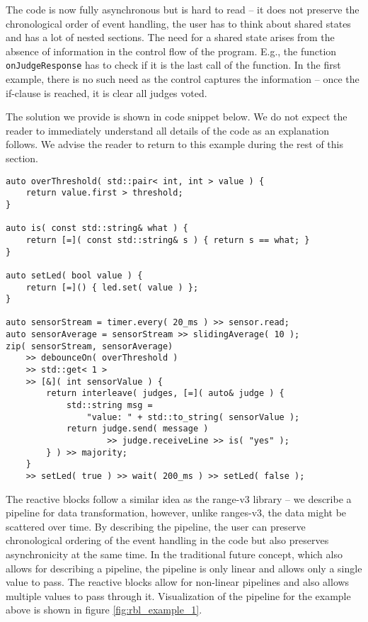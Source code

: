 The code is now fully asynchronous but is hard to read -- it does not preserve
the chronological order of event handling, the user has to think about shared
states and has a lot of nested sections. The need for a shared state arises from
the absence of information in the control flow of the program. E.g., the
function \texttt{onJudgeResponse} has to check if it is the last call of the
function. In the first example, there is no such need as the control captures
the information -- once the if-clause is reached, it is clear all judges voted.

The solution we provide is shown in code snippet below. We do not expect the
reader to immediately understand all details of the code as an explanation
follows. We advise the reader to return to this example during the rest of
this section.

\begin{verbatim}
auto overThreshold( std::pair< int, int > value ) {
    return value.first > threshold;
}

auto is( const std::string& what ) {
    return [=]( const std::string& s ) { return s == what; }
}

auto setLed( bool value ) {
    return [=]() { led.set( value ) };
}

auto sensorStream = timer.every( 20_ms ) >> sensor.read;
auto sensorAverage = sensorStream >> slidingAverage( 10 );
zip( sensorStream, sensorAverage)
    >> debounceOn( overThreshold )
    >> std::get< 1 >
    >> [&]( int sensorValue ) {
        return interleave( judges, [=]( auto& judge ) {
            std::string msg =
                "value: " + std::to_string( sensorValue );
            return judge.send( message )
                    >> judge.receiveLine >> is( "yes" );
        } ) >> majority;
    }
    >> setLed( true ) >> wait( 200_ms ) >> setLed( false );
\end{verbatim}

The reactive blocks follow a similar idea as the range-v3 library -- we describe
a pipeline for data transformation, however, unlike ranges-v3, the data might be
scattered over time. By describing the pipeline, the user can preserve
chronological ordering of the event handling in the code but also preserves
asynchronicity at the same time. In the traditional future concept, which also
allows for describing a pipeline, the pipeline is only linear and allows only a
single value to pass. The reactive blocks allow for non-linear pipelines and
also allows multiple values to pass through it. Visualization of the pipeline
for the example above is shown in figure \ref{fig:rbl_example_1}.

